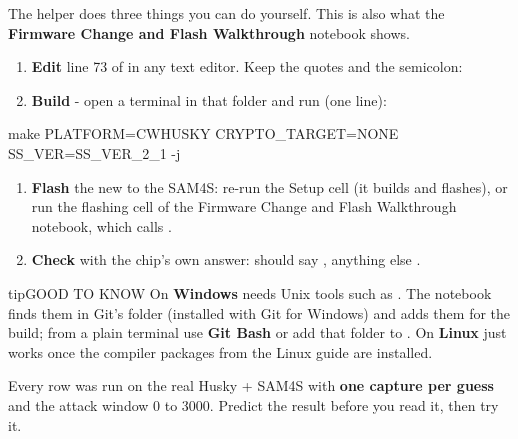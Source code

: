 \documentclass[11pt,letterpaper]{article}
\begin{document}

The helper does three things you can do yourself. This is also what the \textbf{Firmware Change and Flash Walkthrough}
notebook shows.

\begin{enumerate}[label=\arabic*.,leftmargin=1.8em,itemsep=2pt,topsep=2pt,parsep=0pt,start=1]
\item \textbf{Edit} line 73 of  in any text editor. Keep the quotes and the semicolon: 
\item \textbf{Build} - open a terminal in that folder and run (one line):
\end{enumerate}

\begin{guidecode}
make PLATFORM=CWHUSKY CRYPTO_TARGET=NONE SS_VER=SS_VER_2_1 -j
\end{guidecode}

\begin{enumerate}[label=\arabic*.,leftmargin=1.8em,itemsep=2pt,topsep=2pt,parsep=0pt,start=3]
\item \textbf{Flash} the new  to the SAM4S: re-run the Setup cell (it builds and flashes), or run the flashing cell of the Firmware Change and Flash Walkthrough notebook, which calls .
\item \textbf{Check} with the chip's own answer:  should say , anything else .
\end{enumerate}

\begin{guidecallout}{tip}{GOOD TO KNOW}
On \textbf{Windows}  needs Unix tools such as . The notebook finds them in Git's
 folder (installed with Git for Windows) and adds them for the build; from a plain
terminal use \textbf{Git Bash} or add that folder to . On \textbf{Linux}  just works once the
compiler packages from the Linux guide are installed.
\end{guidecallout}


Every row was run on the real Husky + SAM4S with \textbf{one capture per guess} and the attack window 0 to 3000.
Predict the result before you read it, then try it.
\end{document}

